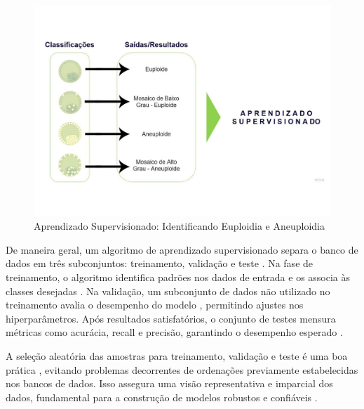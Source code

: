 \begin{figure}[h]
    \captionsetup{font=footnotesize, position=above}
    \caption{Aprendizado Supervisionado: Identificando Euploidia e Aneuploidia}
    \label{fig:biopsiaPGT-A}
    \centering
    \includegraphics[scale=0.35]{figuras/aprendizadoSuper.pdf}
    \vspace{0.3cm} 
\end{figure}
\FloatBarrier

De maneira geral, um algoritmo de aprendizado supervisionado separa o banco de dados em três subconjuntos: treinamento, validação e teste \cite{izbicki2020}. Na fase de treinamento, o algoritmo identifica padrões nos dados de entrada e os associa às classes desejadas \cite{izbicki2020}. Na validação, um subconjunto de dados não utilizado no treinamento avalia o desempenho do modelo \cite{izbicki2020}, permitindo ajustes nos hiperparâmetros. Após resultados satisfatórios, o conjunto de testes mensura métricas como acurácia, recall e precisão, garantindo o desempenho esperado \cite{izbicki2020}.

A seleção aleatória das amostras para treinamento, validação e teste é uma boa prática \cite{izbicki2020}, evitando problemas decorrentes de ordenações previamente estabelecidas nos bancos de dados. Isso assegura uma visão representativa e imparcial dos dados, fundamental para a construção de modelos robustos e confiáveis \cite{izbicki2020}. 

